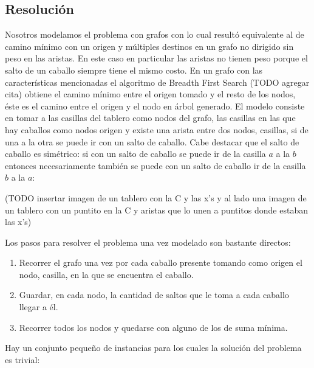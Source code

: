 \subsection{Resolución}
Nosotros modelamos el problema con grafos con lo cual resultó equivalente al de camino mínimo 
con un origen y múltiples destinos en un grafo no dirigido sin peso en las aristas. 
En este caso en particular las aristas no tienen peso porque el salto de un caballo siempre 
tiene el mismo costo. En un grafo con las características mencionadas el algoritmo de 
Breadth First Search (TODO agregar cita) obtiene el camino mínimo entre el origen tomado y el resto de los nodos,
éste es el camino entre el origen y el nodo en árbol generado.
El modelo consiste en tomar a las casillas del tablero como nodos del grafo, las casillas en las que 
hay caballos como nodos origen y existe una arista entre dos nodos, casillas, si de una a la otra se
puede ir con un salto de caballo. Cabe destacar que el salto de caballo es simétrico: si con un salto
de caballo se puede ir de la casilla $a$ a la $b$ entonces necesariamente también se puede con un 
salto de caballo ir de la casilla $b$ a la $a$:\\
\begin{center}
(TODO insertar imagen de un tablero con la C y las x's y al lado una imagen de un tablero con un puntito en
la C y aristas que lo unen a puntitos donde estaban las x's)
\end{center}
Los pasos para resolver el problema una vez modelado son bastante directos:
\begin{enumerate}
  \item Recorrer el grafo una vez por cada caballo presente tomando como origen el nodo, casilla, en la 
    que se encuentra el caballo.
  \item Guardar, en cada nodo, la cantidad de saltos que le toma a cada caballo llegar a él.
  \item Recorrer todos los nodos y quedarse con alguno de los de suma mínima.
\end{enumerate}
Hay un conjunto pequeño de instancias para los cuales la solución del problema es trivial:
